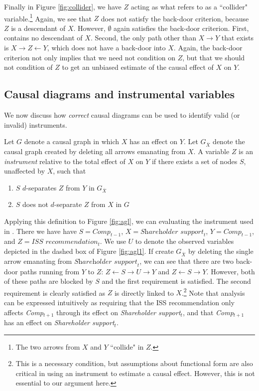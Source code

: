 \documentclass[12pt,reqno,titlepage]{amsart}
\begin{document}
Finally in Figure \ref{fig:collider}, we have $Z$ acting as what \citet[p.\,17]{Pearl:2009kh} refers to as a ``collider" variable.\footnote{
The two arrows from $X$ and $Y$ ``collide" in $Z$.} 
Again, we see that $Z$ does not satisfy the back-door criterion, because $Z$ is a descendant of $X$.
However, $\emptyset$ again satisfies the back-door criterion.
First, contains no descendant of $X$.
Second, the only path other than $X \rightarrow Y$ that exists is $X \rightarrow Z \leftarrow Y$, which does not have a back-door into $X$.
Again, the back-door criterion not only implies that we need not condition on $Z$, but that we should not condition of $Z$ to get an unbiased estimate of the causal effect of $X$ on $Y$.

\subsection{Causal diagrams and instrumental variables}

We now discuss how \emph{correct} causal diagrams can be used to identify valid (or invalid) instruments.
 

\begin{definition}[Instrument]
Let $G$ denote a causal graph in which $X$ has an effect on $Y$. 
Let $G_{\overline{X}}$ denote the causal graph created by deleting all arrows emanating from $X$.
A variable $Z$ is an \emph{instrument} relative to the total effect of $X$ on $Y$ if there exists a set of nodes $S$, unaffected by $X$, such that
\begin{enumerate}
\item $S$ $d$-separates $Z$ from $Y$ in $G_{\overline{X}}$
\item $S$ does not $d$-separate $Z$ from $X$ in $G$
\end{enumerate}
\end{definition}

Applying this definition to Figure \ref{fig:agl}, we can evaluating the instrument used in \citet{Armstrong:2013io}.
There we have have $S = \textit{Comp}_{t-1}$,
$X =\textit{Shareholder support}_{t}$, $Y = \textit{Comp}_{t-1}$, and $Z = \textit{ISS recommendation}_{t}$.
We use $U$ to denote the observed variables depicted in the dashed box of Figure \ref{fig:agl1}.
If create $G_{\overline{X}}$ by deleting the single arrow emanating from $\textit{Shareholder support}_{t}$, we can see that there are two back-door paths running from $Y$ to $Z$: 
$Z \leftarrow S \rightarrow U \rightarrow Y$ and $Z \leftarrow S \rightarrow Y$.
However, both of these paths are blocked by $S$ and the first requirement is satisfied.
The second requirement is clearly satisfied as $Z$ is directly linked to $X$.\footnote{
This is a necessary condition, but assumptions about functional form are also critical in using an instrument to estimate a causal effect.
However, this is not essential to our argument here.}
%
Note that analysis can be expressed intuitively as requiring that the ISS recommendation only affects \textit{Comp}$_{t+1}$ through its effect on \textit{Shareholder support}$_{t}$, and that \textit{Comp}$_{t+1}$ has an effect on \textit{Shareholder support}$_{t}$.
\end{document}
